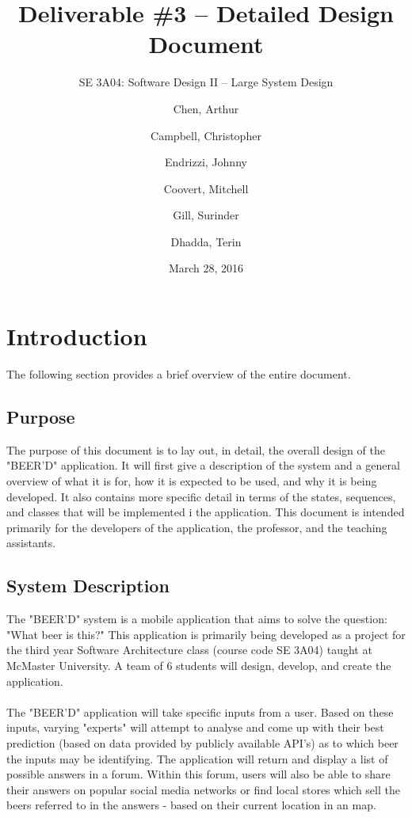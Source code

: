 \documentclass[]{article}
\title{Deliverable \#3 -- Detailed Design Document}
\author{SE 3A04: Software Design II -- Large System Design}
\author{Chen, Arthur \and Campbell, Christopher \and Endrizzi, Johnny \\ 
\and Coovert, Mitchell \and Gill, Surinder \and Dhadda, Terin}
\date{March 28, 2016}
\begin{document}
\maketitle	
\newpage
\tableofcontents
\listoffigures
\listoftables
\newpage

\section{Introduction}
\label{sec:introduction}
The following section provides a brief overview of the entire document.

\subsection{Purpose}
\label{sub:purpose}
The purpose of this document is to lay out, in detail, the overall design of the "BEER'D" application. It will first give a description of the system and a general overview of what it is for, how it is expected to be used, and why it is being developed. It also contains more specific detail in terms of the states, sequences, and classes that will be implemented i the application. This document is intended primarily for the developers of the application, the professor, and the teaching assistants.

\subsection{System Description}
\label{sub:system_description}
The "BEER'D" system is a mobile application that aims to solve the question: "What beer is this?" This application is primarily being developed as a project for the third year Software Architecture class (course code SE 3A04) taught at McMaster University. A team of 6 students will design, develop, and create the application.\\
\\
The "BEER'D" application will take specific inputs from a user. Based on these inputs, varying "experts" will attempt to analyse and come up with their best prediction (based on data provided by publicly available API's) as to which beer the inputs may be identifying. The application will return and display a list of possible answers in a forum. Within this forum, users will also be able to share their answers on popular social media networks or find local stores which sell the beers referred to in the answers - based on their current location in an map.
\end{document}
